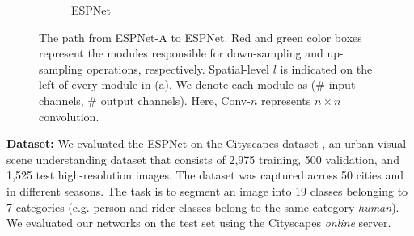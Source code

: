 \documentclass[runningheads]{llncs}
\begin{document}
\begin{figure}[t!]
\begin{subfigure}[b]{0.35\columnwidth}
{\newcommand{\shuffle}{
  \begin{tikzpicture}[
block/.style={
align=center,rounded corners, line width=\lw,
font=\Huge}]
	\node[block] (x) {};
    \node[right=2cm of x] (xd) {};
    \node[block,draw, fill=gray, minimum size=0.1cm, below=0.75cm of x] (x1) {$M, 1\times1, d$};
    \node[block,draw, fill=gray!30, minimum size=0.1cm, below=1cm of x1] (x2) {$d, 3\times3, d$};
    \node[block,draw, fill=gray, minimum size=0.1cm, below=1cm of x2] (x3) {$d, 1\times1, N$};
    \node[draw, fill=white, minimum size=0.1cm, below=1cm of x3, line width=\lw] (sum) {\Huge Sum};
    \node[right=1.2cm of sum] (sumd) {};
    \node[fill=white, minimum size=0.1cm, below=1cm of sum, line width=\lw] (y) {};
    
    \draw[thick, ->, line width=\lw] (x.north) -- (x1);
    \draw[thick, ->, line width=\lw] (x1) -- (x2);
    \draw[thick, ->, line width=\lw] (x2) -- (x3);
    \draw[thick, ->, line width=\lw] (x3) -- (sum);
    \draw[thick, ->, line width=\lw] (sum) -- (y);
    \draw[thick, ->, line width=\lw] (x.south) -- (xd.south) --(sumd.center) -- (sum);
    


 \end{tikzpicture}
} \architecture
}
\caption{ESPNet}
\label{fig:espnetFullArch}
\end{subfigure}
\caption{The path from ESPNet-A to ESPNet. Red and green color boxes represent the modules responsible for down-sampling and up-sampling operations, respectively. Spatial-level $l$ is indicated on the left of every module in (a). We denote each module as (\# input channels, \# output channels). Here, Conv-$n$ represents $n\times n$ convolution.}
\label{fig:espNetVariants}
\end{figure}

\noindent \textbf{Dataset:} We evaluated the ESPNet on the Cityscapes dataset \cite{cordts2016cityscapes}, an urban visual scene understanding dataset that consists of 2,975 training, 500 validation, and 1,525 test high-resolution images. The dataset was captured across 50 cities and in different seasons. The task is to segment an image into 19 classes belonging to 7 categories (e.g. person and rider classes belong to the same category \textit{human}). We evaluated our networks on the test set using the Cityscapes \textit{online} server.
\end{document}
